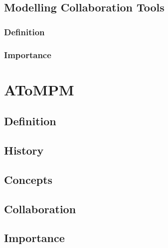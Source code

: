 \subsection{Modelling Collaboration Tools}
\subsubsection{Definition}
\subsubsection{Importance}

\section{AToMPM}
\subsection{Definition}
\subsection{History}
\subsection{Concepts}
\subsection{Collaboration}
\subsection{Importance}

